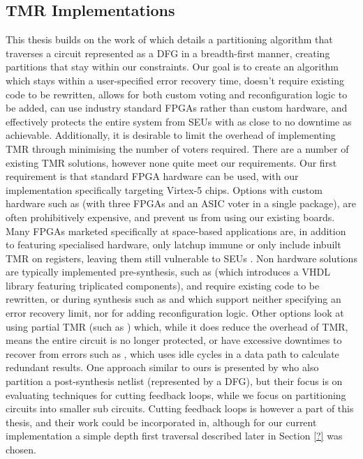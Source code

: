 \documentclass[12pt,final,oneside]{dwThesis} %
\begin{document}
   \subsection{\gls{TMR}
      Implementations} This thesis builds on the
   work of\cite{DiesselChange} which details a partitioning algorithm that
   traverses a circuit represented as a \gls{DFG} in a breadth-first manner,
   creating partitions that stay within our constraints.  Our goal is to create an
   algorithm which stays within a user-specified error recovery time, doesn't
   require existing code to be rewritten, allows for both custom voting and
   reconfiguration logic to be added, can use industry standard \glspl{FPGA}
   rather than custom hardware, and effectively protects the entire system from
   \glspl{SEU} with as close to no downtime as achievable.  Additionally, it is
   desirable to limit the overhead of implementing \gls{TMR} through minimising
   the number of voters required.  There are a number of existing \gls{TMR}
   solutions, however none quite meet our requirements.  Our first requirement is
   that standard \gls{FPGA} hardware can be used, with our implementation
   specifically targeting Virtex-5 chips. Options with custom hardware such as
   \cite{VFPGATMR} (with three \glspl{FPGA} and an \gls{ASIC} voter in a single
   package), are often prohibitively expensive, and prevent us from using our
   existing boards.  Many \glspl{FPGA} marketed specifically at space-based
   applications are, in addition to featuring specialised hardware, only
   latchup immune or only include inbuilt \gls{TMR} on registers,
   leaving them still vulnerable to \glspl{SEU} \cite{FPGAReview}.  Non hardware
   solutions are typically implemented pre-synthesis, such as \cite{ftmr} (which
   introduces a \gls{VHDL} library featuring triplicated components), and require
   existing code to be rewritten, or during synthesis such as \cite{synplify} and
   \cite{tmrtool} which support neither specifying an error recovery limit, nor
   for adding reconfiguration logic.  Other options look at using partial
   \gls{TMR} (such as \cite{partialTMR}) which, while it does reduce the overhead
   of \gls{TMR}, means the entire circuit is no longer protected, or have
   excessive downtimes to recover from errors such as \cite{VTMR}, which uses idle
   cycles in a data path to calculate redundant results.  One approach similar to
   ours is presented by \cite{PostSynth} who also partition a post-synthesis
   netlist (represented by a \gls{DFG}), but their focus is on evaluating
   techniques for cutting feedback loops, while we focus on partitioning circuits
   into smaller sub circuits. Cutting feedback loops is however a part of this
   thesis, and their work could be incorporated in, although for our current
   implementation a simple depth first traversal described later in Section
   \ref{?} was chosen.
\end{document}
